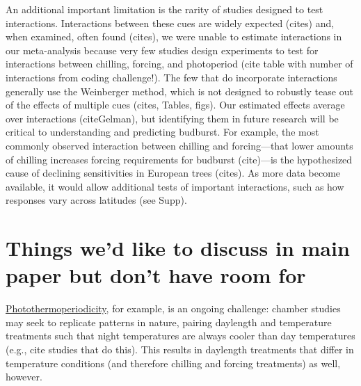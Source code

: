 \documentclass{article}
\begin{document}

\par An additional important limitation is the rarity of studies designed to test interactions. Interactions between these cues are widely expected (cites) and, when examined, often found (cites), we were unable to estimate interactions in our meta-analysis because very few studies design experiments to test for interactions between chilling, forcing, and photoperiod (cite table with number of interactions from coding challenge!). The few that do incorporate interactions generally use the Weinberger method, which is not designed to robustly tease out of the effects of multiple cues (cites, Tables, figs).  Our estimated effects average over interactions (citeGelman), but identifying them in future research will be critical to understanding and predicting budburst. For example, the most commonly observed interaction between chilling and forcing---that lower amounts of chilling increases forcing requirements for budburst (cite)---is the hypothesized cause of declining sensitivities in European trees (cites). As more data become available, it would allow additional tests of important interactions, such as how responses vary across latitudes (see Supp). %

\section*{Things we'd like to discuss in main paper but don't have room for}

\par \underline{Photothermoperiodicity}, for example, is an ongoing challenge: chamber studies may seek to replicate patterns in nature, pairing daylength and temperature treatments such that night temperatures are always cooler than day temperatures (e.g., cite studies that do this).  This results in daylength treatments that differ in temperature conditions (and therefore chilling and forcing treatments) as well, however.  
\end{document}
